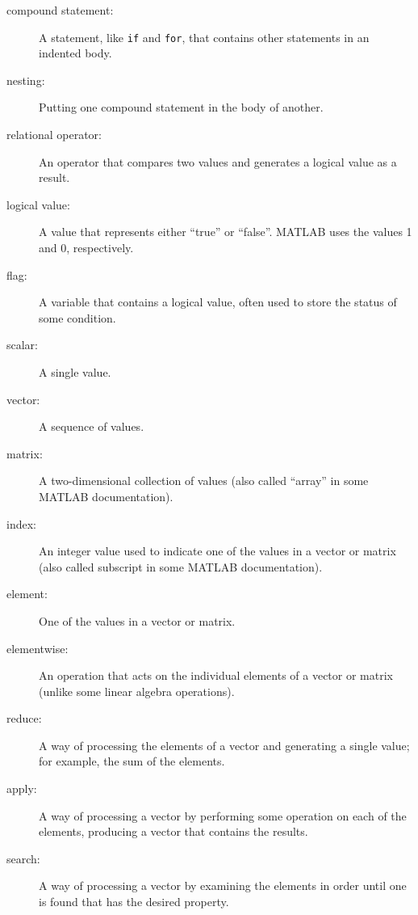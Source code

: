\documentclass[
]{book}
\numberwithin{Answer}{chapter}
\numberwithin{Exercise}{chapter}
\begin{document}
\begin{description}

\item[compound statement:] A statement, like {\tt if} and {\tt for}, that
contains other statements in an indented body.

\item[nesting:] Putting one compound statement in the body of another.

\item[relational operator:] An operator that compares two values and
generates a logical value as a result.

\item[logical value:] A value that represents either ``true'' or
``false''.  MATLAB uses the values 1 and 0, respectively.

\item[flag:] A variable that contains a logical value, often used
to store the status of some condition.

\item[scalar:] A single value.

\item[vector:] A sequence of values.

\item[matrix:] A two-dimensional collection of values (also called
``array'' in some MATLAB documentation).

\item[index:] An integer value used to indicate one of the values
in a vector or matrix (also called subscript in some MATLAB documentation).

\item[element:] One of the values in a vector or matrix.

\item[elementwise:] An operation that acts on the individual elements
of a vector or matrix (unlike some linear algebra operations).

\item[reduce:] A way of processing the elements of a vector and
generating a single value; for example, the sum of the elements.

\item[apply:] A way of processing a vector by performing some operation
on each of the elements, producing a vector that contains the
results.

\item[search:] A way of processing a vector by examining the
elements in order until one is found that has the desired property.

\end{description}
\end{document}
